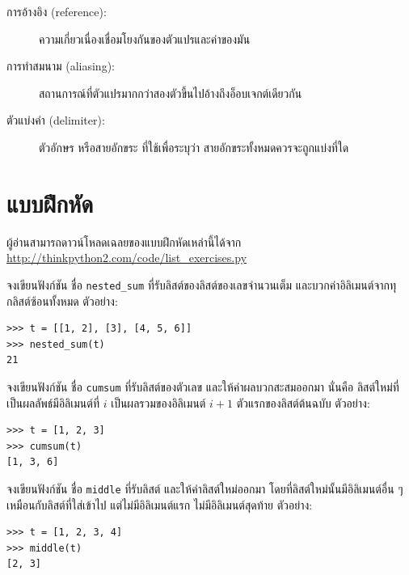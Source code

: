 \begin{description}
\item[การอ้างอิง (reference):] ความเกี่ยวเนื่องเชื่อมโยงกันของตัวแปรและค่าของมัน

\item[การทำสมนาม (aliasing):] สถานการณ์ที่ตัวแปรมากกว่าสองตัวขึ้นไปอ้างถึงอ็อบเจกต์เดียวกัน

\item[ตัวแบ่งคำ (delimiter):] ตัวอักษร หรือสายอักขระ ที่ใช้เพื่อระบุว่า สายอักขระทั้งหมดควรจะถูกแบ่งที่ใด

\end{description}


\section{แบบฝึกหัด}

ผู้อ่านสามารถดาวน์โหลดเฉลยของแบบฝึกหัดเหล่านี้ได้จาก
\url{http://thinkpython2.com/code/list_exercises.py}
\\

\begin{exercise}

จงเขียนฟังก์ชัน ชื่อ \verb|nested_sum| ที่รับลิสต์ของลิสต์ของเลขจำนวนเต็ม
และบวกค่าอิลิเมนต์จากทุกลิสต์ซ้อนทั้งหมด
ตัวอย่าง:

\begin{verbatim}
>>> t = [[1, 2], [3], [4, 5, 6]]
>>> nested_sum(t)
21
\end{verbatim}

\end{exercise}
\vspace{0.5cm}


\begin{exercise}
\label{cumulative}

จงเขียนฟังก์ชัน ชื่อ \texttt{cumsum} ที่รับลิสต์ของตัวเลข
และให้ค่าผลบวกสะสมออกมา 
นั่นคือ ลิสต์ใหม่ที่เป็นผลลัพธ์มีอิลิเมนต์ที่ {\scriptsize$i$} เป็นผลรวมของอิลิเมนต์ {\scriptsize$i+1$} ตัวแรกของลิสต์ต้นฉบับ
ตัวอย่าง:


\begin{verbatim}
>>> t = [1, 2, 3]
>>> cumsum(t)
[1, 3, 6]
\end{verbatim}

\end{exercise}
\vspace{0.5cm}


\begin{exercise}
จงเขียนฟังก์ชัน ชื่อ \texttt{middle} ที่รับลิสต์
และให้ค่าลิสต์ใหม่ออกมา
โดยที่ลิสต์ใหม่นั้นมีอิลิเมนต์อื่น ๆ เหมือนกับลิสต์ที่ใส่เข้าไป แต่ไม่มีอิลิเมนต์แรก ไม่มีอิลิเมนต์สุดท้าย
ตัวอย่าง:

\begin{verbatim}
>>> t = [1, 2, 3, 4]
>>> middle(t)
[2, 3]
\end{verbatim}

\end{exercise}
\vspace{0.5cm}


